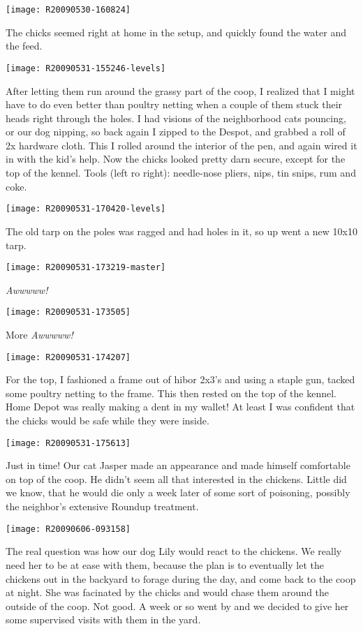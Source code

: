 \texttt{[image: R20090530-160824]}

The chicks seemed right at home in the setup, and quickly found the
water and the feed. 
\newpage

\texttt{[image: R20090531-155246-levels]}

After letting them run around the grassy part of the coop, I realized
that I might have to do even better than poultry netting when a couple
of them stuck their heads right through the holes.  I had visions of the
neighborhood cats pouncing, or our dog nipping, so back again I zipped
to the Despot, and grabbed a roll of 2x hardware cloth.  This I rolled
around the interior of the pen, and again wired it in with the kid's
help.  Now the chicks looked pretty darn secure, except for the top of
the kennel.  Tools (left ro right): needle-nose pliers, nips, tin snips,
rum and coke. 
\newpage

\texttt{[image: R20090531-170420-levels]}

The old tarp on the poles was ragged and had holes in it, so up went a
new 10x10 tarp. 
\newpage

\texttt{[image: R20090531-173219-master]}

{\em Awwwww!}
\newpage

\texttt{[image: R20090531-173505]}

More {\em Awwwww!}
\newpage

\texttt{[image: R20090531-174207]}

For the top, I fashioned a frame out of hibor 2x3's and using a staple
gun, tacked some poultry netting to the frame.  This then rested on the
top of the kennel.  Home Depot was really making a dent in my wallet!
At least I was confident that the chicks would be safe while they were
inside. 
\newpage

\texttt{[image: R20090531-175613]}

Just in time!  Our cat Jasper made an appearance and made himself
comfortable on top of the coop.  He didn't seem all that interested in
the chickens.  Little did we know, that he would die only a week later
of some sort of poisoning, possibly the neighbor's extensive Roundup
treatment. 
\newpage

\texttt{[image: R20090606-093158]}

The real question was how our dog Lily would react to the chickens.  We
really need her to be at ease with them, because the plan is to
eventually let the chickens out in the backyard to forage during the
day, and come back to the coop at night.  She was facinated by the
chicks and would chase them around the outside of the coop.  Not good.
A week or so went by and we decided to give her some supervised visits
with them in the yard. 
\newpage

